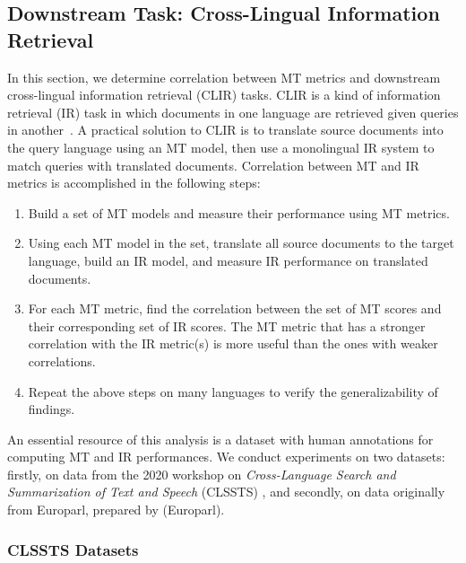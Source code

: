 \subsection{Downstream Task: Cross-Lingual Information Retrieval}
\label{sec:clir}
In this section, we determine correlation between MT metrics and  downstream cross-lingual information retrieval (CLIR) tasks.
CLIR is a kind of information retrieval (IR) task in which documents in one language are retrieved given queries in another~\cite{grefenstette2012CLIR}. 
A practical solution to CLIR is to translate source documents into the query language using an MT model, then use a monolingual IR system to match queries with translated documents. 
Correlation between MT and IR metrics is accomplished in the following steps: 
\begin{enumerate}[noitemsep,topsep=0pt]
 \item Build a set of MT models and measure their performance using MT metrics.
 \item Using each MT model in the set, translate all source documents to the target language, build an IR model, and measure IR performance on translated documents.
 \item For each MT metric, find the correlation between the set of MT scores and their corresponding set of IR scores.
 The MT metric that has a stronger correlation with the IR metric(s) is more useful than the ones with weaker correlations.
\item Repeat the above steps on many languages to verify the generalizability of findings.
\end{enumerate}


An essential resource of this analysis is a dataset with human annotations for computing MT and IR performances.
We conduct experiments on two datasets: firstly, on data from the 2020 workshop on \textit{Cross-Language Search and Summarization of Text and Speech} (CLSSTS) \cite{zavorin-etal-2020-corpora}, and secondly, on data originally from Europarl, prepared by \citet{lignos-etal-2019-MT-IR} (Europarl).

\subsubsection{CLSSTS Datasets}
\label{sec:material}

